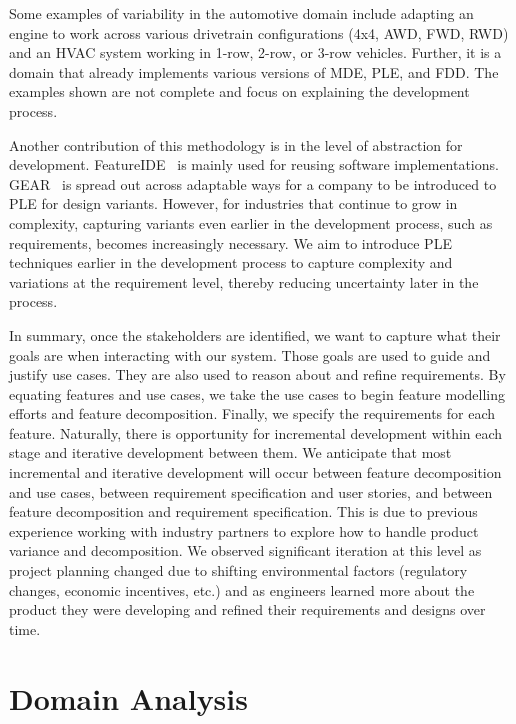 Some examples of variability in the automotive domain include adapting an engine to work across various drivetrain configurations (4x4, AWD, FWD, RWD) and an HVAC system working in 1-row, 2-row, or 3-row vehicles. Further, it is a domain that already implements various versions of \gls{MDE}, \gls{PLE}, and \gls{FDD}. The examples shown are not complete and focus on explaining the development process. 

Another contribution of this methodology is in the level of abstraction for development. FeatureIDE~\cite{thum2014featureide} is mainly used for reusing software implementations. GEAR~\cite{GEARS} is spread out across adaptable ways for a company to be introduced to \gls{PLE} for design variants. However, for industries that continue to grow in complexity, capturing variants even earlier in the development process, such as requirements, becomes increasingly necessary. We aim to introduce \gls{PLE} techniques earlier in the development process to capture complexity and variations at the requirement level, thereby reducing uncertainty later in the process.

In summary, once the stakeholders are identified, we want to capture what their goals are when interacting with our system. Those goals are used to guide and justify use cases. They are also used to reason about and refine requirements. By equating features and use cases, we take the use cases to begin feature modelling efforts and feature decomposition. Finally, we specify the requirements for each feature. Naturally, there is opportunity for incremental development within each stage and iterative development between them. We anticipate that most incremental and iterative development will occur between feature decomposition and use cases, between requirement specification and user stories, and between feature decomposition and requirement specification. This is due to previous experience working with industry partners to explore how to handle product variance and decomposition. We observed significant iteration at this level as project planning changed due to shifting environmental factors (regulatory changes, economic incentives, etc.) and as engineers learned more about the product they were developing and refined their requirements and designs over time.

\section{Domain Analysis}

